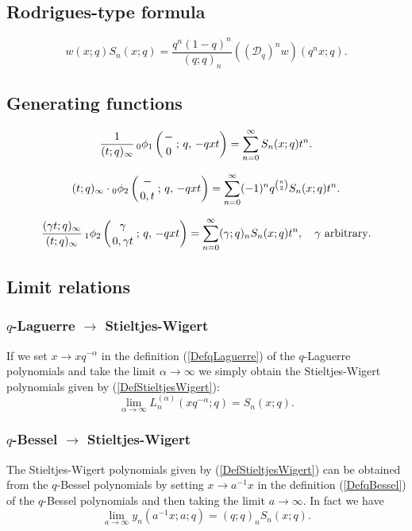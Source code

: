 \documentclass[envcountchap,graybox]{svmono}
\newcounter{rom}
\newcommand{\qhyp}[5]{\mbox{}_{#1}{\phi}_{#2}
\left(\genfrac{}{}{0pt}{}{#3}{#4}\,;\,q,\,#5\right)}
\newcommand{\qhyp}[5]{\,\mbox{}_{#1}\phi_{#2}\!\left(
  \genfrac{}{}{0pt}{}{#3}{#4};#5\right)}
\begin{document}
{{\subsection*{Rodrigues-type formula}
\begin{equation}
\label{RodStieltjesWigert}
w(x;q)S_n(x;q)=\frac{q^n(1-q)^n}{(q;q)_n}\left(\left(\mathcal{D}_q\right)^n w\right)(q^nx;q).
\end{equation}

\subsection*{Generating functions}
\begin{equation}
\label{GenStieltjesWigert1}
\frac{1}{(t;q)_{\infty}}\,\qhyp{0}{1}{-}{0}{-qxt}=
\sum_{n=0}^{\infty}S_n(x;q)t^n.
\end{equation}

\begin{equation}
\label{GenStieltjesWigert2}
(t;q)_{\infty}\cdot\qhyp{0}{2}{-}{0,t}{-qxt}=
\sum_{n=0}^{\infty}(-1)^nq^{\binom{n}{2}}S_n(x;q)t^n.
\end{equation}

\begin{equation}
\label{GenStieltjesWigert3}
\frac{(\gamma t;q)_{\infty}}{(t;q)_{\infty}}\,\qhyp{1}{2}{\gamma}{0,\gamma t}{-qxt}
=\sum_{n=0}^{\infty}(\gamma;q)_nS_n(x;q)t^n,\quad\textrm{$\gamma$ arbitrary}.
\end{equation}

\subsection*{Limit relations}

\subsubsection*{$q$-Laguerre $\rightarrow$ Stieltjes-Wigert}
If we set $x\rightarrow xq^{-\alpha}$ in the definition
(\ref{DefqLaguerre}) of the $q$-Laguerre polynomials and take the limit
$\alpha\rightarrow\infty$ we simply obtain the Stieltjes-Wigert polynomials given
by (\ref{DefStieltjesWigert}):
$$\lim_{\alpha\rightarrow\infty}L_n^{(\alpha)}\left(xq^{-\alpha};q\right)=S_n(x;q).$$

\subsubsection*{$q$-Bessel $\rightarrow$ Stieltjes-Wigert}
The Stieltjes-Wigert polynomials given by (\ref{DefStieltjesWigert}) can be obtained
from the $q$-Bessel polynomials by setting $x\rightarrow a^{-1}x$ in the definition
(\ref{DefqBessel}) of the $q$-Bessel polynomials and then taking the limit
$a\rightarrow\infty$. In fact we have
$$\lim_{a\rightarrow\infty}y_n(a^{-1}x;a;q)=(q;q)_nS_n(x;q).$$

}}
\end{document}
